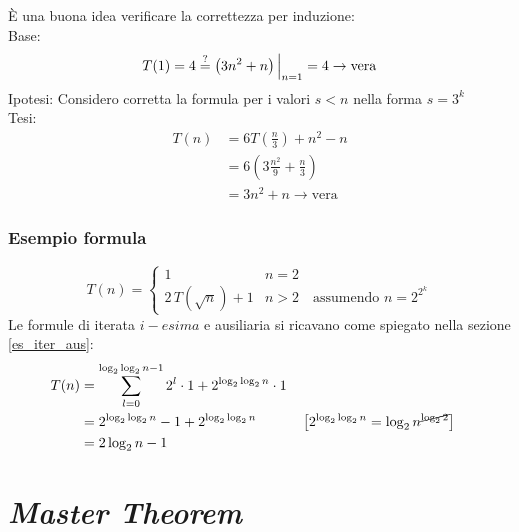 È una buona idea verificare la correttezza per induzione:\\
Base: 
\[ T(1)=4 \overset{?}{=} \left( 3n^2+n \right) \Big|_{n=1} = 4 \rightarrow \text{vera} \]
Ipotesi: Considero corretta la formula per i valori $s<n$ nella forma $s=3^k$ \\
Tesi:
\begin{align*}
    T(n) &= 6T \left( \frac{n}{3} \right) + n^2 -n \\
    & = 6 \left( 3 \frac{n^2}{9} + \frac{n}{3} \right) \\
    & = 3n^2+n\rightarrow \text{vera}
\end{align*}

\subsubsection{Esempio formula}
\[
    T(n) = 
    \begin{cases} 
        1      &  n = 2 \\
        2 \, T\left( \sqrt{n}\right) + 1 & n > 2 \quad \text{assumendo } n=2^{2^k} 
    \end{cases}
\]
Le formule di iterata $i-esima$ e ausiliaria si ricavano come spiegato nella sezione \ref{es_iter_aus}:
\begin{align*}
    T(n) &= \sum_{l=0}^{\log_2 \log_2 n-1} 2^l \cdot 1 + 2^{\log_2 \log_2 n} \cdot 1 \\
    &= 2^{\log_2 \log_2 n} -1 + 2^{\log_2 \log_2 n} 
    && \left[ 2^{\log_2 \log_2 n} = \log_2 n ^{\cancel{\log_2 2}} \right] \\
    &= 2 \log_2 n - 1
\end{align*}

\section{\textit{Master Theorem}}
